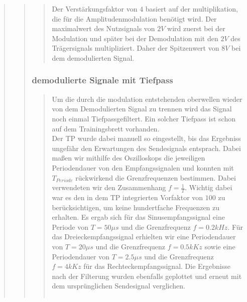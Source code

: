 \begin{quote}
\begin{quote}
\begin{quote}
                    Der Verstärkungsfaktor von $4$ basiert auf der multiplikation, die für die Amplitudenmodulation
                    benötigt wird. Der maximalwert des Nutzsignals von $2V$ wird zuerst bei der Modulation und später
                    bei der Demodulation mit den $2V$ des Trägersignals multipliziert. Daher der Spitzenwert von $8V$
                    bei dem demodulierten Signal.\\
                    
     			
		\end{quote}
		
		\subsubsection{demodulierte Signale mit Tiefpass}
		\begin{quote}
                    Um die durch die modulation entstehenden oberwellen wieder von dem Demodulierten Signal zu
                    trennen wird das Signal noch einmal Tiefpassgefiltert. Ein solcher Tiefpass ist schon auf dem
                    Trainingsbrett vorhanden.\\
                    Der TP wurde dabei manuell so eingestellt, bis das Ergebniss ungefähr 
                    den Erwartungen des Sendesignals entsprach. Dabei maßen wir
                    mithilfe des Oszilloskops die jeweiligen Periodendauer von den
                    Empfangssignalen und konnten mit $T_{Periode}$ rückwirkend die
                    Grenzfrequenzen bestimmen. Dabei verwendeten wir den
                    Zusammenhang $f = \frac{1}{T}$. Wichtig dabei war es den in dem
                    TP integrierten Vorfaktor von $100$ zu berücksichtigen, um keine 
                    hundertfache Frequenzen zu erhalten. Es ergab sich für das
                    Sinusempfangssignal eine Periode von $T = 50\mu s$ und die
                    Grenzfrequenz $f = 0.2 kHz$. Für das Dreieckempfangssignal
                    erhielten wir eine Periodendauer von $T = 20\mu s$ und die Grenzfrequenz
                    $f = 0.5 kKz$ sowie eine Periodendauer von $T = 2.5\mu s$ und
                    die Grenzfrequenz $f = 4 kKz$ für das Rechteckempfangssignal.
                    Die Ergebnisse nach der Filterung wurden ebenfalls geplottet und
                    erneut mit dem ursprünglichen Sendesignal verglichen.
                    
                    \begin{center}
                \begin{tabular}{ll}
    

\end{tabular}
\end{center}
\end{quote}
\end{quote}
\end{quote}
